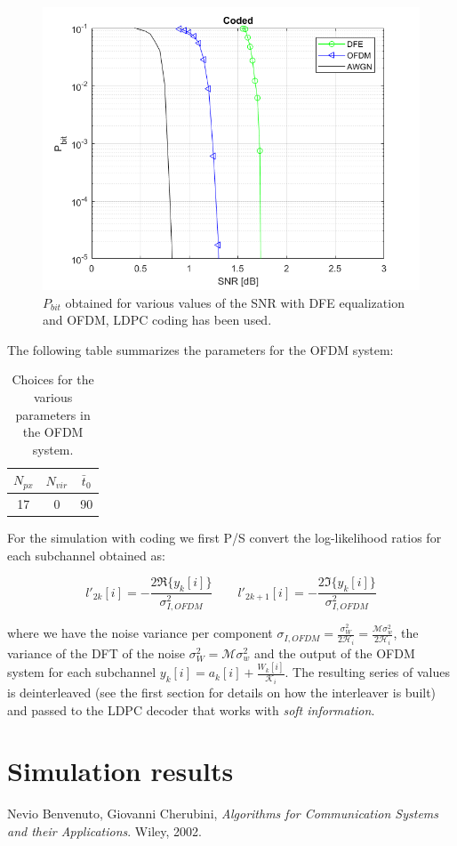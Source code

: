 \documentclass[a4paper,11.5pt]{article}
\begin{document}
\begin{figure}[H]
	\begin{center}   
		\includegraphics[width=\textwidth]{figs/Pbit_coded.png} 
		\caption{$P_{bit}$ obtained for various values of the SNR with DFE equalization and OFDM, LDPC coding has been used.}
		\label{fig:Pbit_coded}
	\end{center}
\end{figure}

The following table summarizes the parameters for the OFDM system:

\begin{table}[htbp]
	\begin{center}
		\begin{tabular}{ccc}
			\toprule
			$N_{px}$ & $N_{vir}$ &$\bar{t}_0$ \\
			\midrule
			17 & 0 &90 \\
			\bottomrule
		\end{tabular}
	\end{center}
	\label{tab:sumup2}
	\caption{Choices for the various parameters in the OFDM system.}
\end{table} 

For the simulation with coding we first P/S convert the log-likelihood ratios for each subchannel obtained as:

\begin{equation}
l'_{2k}[i] =- \frac{2 \Re\{y_k[i]\}}{\sigma_{I,OFDM}^2} \quad \quad
l'_{2k+1}[i]= - \frac{2 \Im\{y_k[i]\}}{\sigma_{I,OFDM}^2}
\end{equation}

where we have the noise variance per component $\sigma_{I,OFDM} = \frac{\sigma_W^2}{2 \mathcal{H}_i}=\frac{\mathcal{M} \sigma_w^2}{2 \mathcal{H}_i}$, the variance of the DFT of the noise $\sigma_W^2 = \mathcal{M} \sigma_w^2$ and the output of the OFDM system for each subchannel $y_k[i] = a_k[i] + \frac{W_k[i]}{\mathcal{K}_i}$. The resulting series of values is deinterleaved (see the first section for details on how the interleaver is built) and passed to the LDPC decoder that works with \emph{soft information}.

\section*{Simulation results}


 
\begin{thebibliography}{15}	
	Nevio Benvenuto, Giovanni Cherubini,
	\textit{Algorithms for Communication Systems and their Applications}. 
	Wiley, 2002.
\end{thebibliography}
\end{document}
